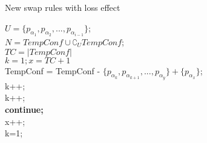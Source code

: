 \documentclass{article}
\begin{document}
\begin{algorithm}
  \LinesNumbered
  \caption{New swap rules with loss effect}
  \KwIn{}
  \KwOut{}
    $U = \{p_{\alpha_1}, p_{\alpha_2},..., p_{\alpha_{i-1}}\}$;\\
    $N = TempConf \cup \complement_U{TempConf}$;\\
    $TC = \left|TempConf\right|$\\
    $k=1; x=TC+1$\\
        {
            {
                {
                    {TempConf = TempConf - $\{p_{\alpha_k}, p_{\alpha_{k+1}},..., p_{\alpha_y}\}+\{p_{\alpha_x}\}$;\\
                    k++;\\}}}
                {k++;\\
                \textup{\textbf{continue;}}\\}
                {x++;\\
                k=1;\\}}
\end{algorithm}
\end{document}
